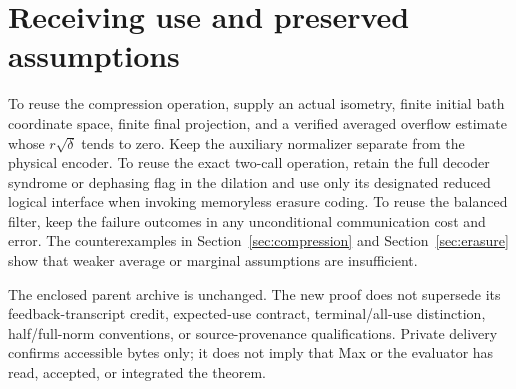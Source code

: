 \section{Receiving use and preserved assumptions}

To reuse the compression operation, supply an actual isometry, finite initial bath coordinate space, finite final projection, and a verified averaged overflow estimate whose $r\sqrt\delta$ tends to zero. Keep the auxiliary normalizer separate from the physical encoder. To reuse the exact two-call operation, retain the full decoder syndrome or dephasing flag in the dilation and use only its designated reduced logical interface when invoking memoryless erasure coding. To reuse the balanced filter, keep the failure outcomes in any unconditional communication cost and error. The counterexamples in Section~\ref{sec:compression} and Section~\ref{sec:erasure} show that weaker average or marginal assumptions are insufficient.

The enclosed parent archive is unchanged. The new proof does not supersede its feedback-transcript credit, expected-use contract, terminal/all-use distinction, half/full-norm conventions, or source-provenance qualifications. Private delivery confirms accessible bytes only; it does not imply that Max or the evaluator has read, accepted, or integrated the theorem.
